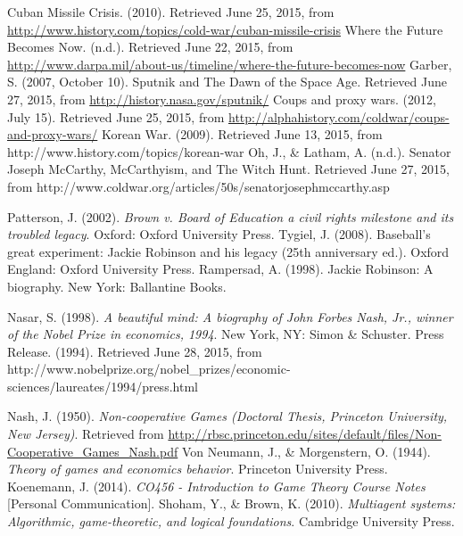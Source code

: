 \documentclass[12pt]{article}
\begin{document}
\begin{thebibliography}{10}
 Cuban Missile Crisis. (2010). Retrieved June 25, 2015, from \url{http://www.history.com/topics/cold-war/cuban-missile-crisis}
 Where the Future Becomes Now. (n.d.). Retrieved June 22, 2015, from \url{http://www.darpa.mil/about-us/timeline/where-the-future-becomes-now}
 Garber, S. (2007, October 10). Sputnik and The Dawn of the Space Age. Retrieved June 27, 2015, from \url{http://history.nasa.gov/sputnik/}
 Coups and proxy wars. (2012, July 15). Retrieved June 25, 2015, from \url{http://alphahistory.com/coldwar/coups-and-proxy-wars/}
 Korean War. (2009). Retrieved June 13, 2015, from {http://www.history.com/topics/korean-war}
 Oh, J., \& Latham, A. (n.d.). Senator Joseph McCarthy, McCarthyism, and The Witch Hunt. Retrieved June 27, 2015, from {http://www.coldwar.org/articles/50s/senatorjosephmccarthy.asp}

 Patterson, J. (2002). \textit{Brown v. Board of Education a civil rights milestone and its troubled legacy}. Oxford: Oxford University Press.
 Tygiel, J. (2008). Baseball's great experiment: Jackie Robinson and his legacy (25th anniversary ed.). Oxford England: Oxford University Press.
 Rampersad, A. (1998). Jackie Robinson: A biography. New York: Ballantine Books.

 Nasar, S. (1998). \textit{A beautiful mind: A biography of John Forbes Nash, Jr., winner of the Nobel Prize in economics, 1994}. New York, NY: Simon \& Schuster.
 Press Release. (1994). Retrieved June 28, 2015, from {http://www.nobelprize.org/nobel\_prizes/economic-sciences/laureates/1994/press.html}


 Nash, J. (1950). \textit{Non-cooperative Games (Doctoral Thesis, Princeton University, New Jersey)}. Retrieved from \url{http://rbsc.princeton.edu/sites/default/files/Non-Cooperative_Games_Nash.pdf}
 Von Neumann, J., \& Morgenstern, O. (1944). \textit{Theory of games and economics behavior}. Princeton University Press.
 Koenemann, J. (2014). \textit{CO456 - Introduction to Game Theory Course Notes} [Personal Communication].
 Shoham, Y., \& Brown, K. (2010). \textit{Multiagent systems: Algorithmic, game-theoretic, and logical foundations}. Cambridge University Press.
\end{thebibliography}
\end{document}
